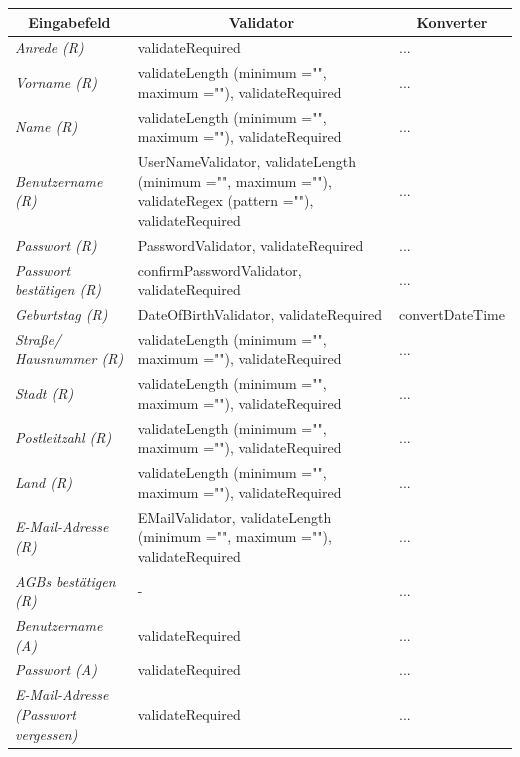 \begin{itemize}
\begin{itemize}
\begin{center}
\begin{longtable}{|p{3cm} |p{8cm} | p{5cm}|}
						\hline \multicolumn{1}{|c|}{\textbf{Eingabefeld}} & \multicolumn{1}{|c|}{\textbf{Validator}} & \multicolumn{1}{|c|}{\textbf{Konverter}} \\ \hline
						\endfirsthead
						\hline
						\endlastfoot
						\textit{Anrede (R)} & validateRequired & ...  \\ \hline
						\textit{Vorname (R)} & validateLength (minimum ="", maximum =""), validateRequired & ... \\ \hline
						\textit{Name (R)} & validateLength (minimum ="", maximum =""), validateRequired & ...  \\ \hline
						\textit{Benutzername (R)} & UserNameValidator, validateLength (minimum ="", maximum =""), validateRegex (pattern =""), validateRequired  & ... \\ \hline
						\textit{Passwort (R)} & PasswordValidator, validateRequired & ...  \\ \hline
						\textit{Passwort bestätigen (R)} & confirmPasswordValidator, validateRequired & ... \\ \hline
						\textit{Geburtstag (R)} & DateOfBirthValidator, validateRequired & convertDateTime  \\ \hline
						\textit{Straße/ Hausnummer (R)} & validateLength (minimum ="", maximum =""), validateRequired & ... \\ \hline
						\textit{Stadt (R)} & validateLength (minimum ="", maximum =""), validateRequired & ...  \\ \hline
						\textit{Postleitzahl (R)} & validateLength (minimum ="", maximum =""), validateRequired & ... \\ \hline
						\textit{Land (R)} & validateLength (minimum ="", maximum =""), validateRequired & ...  \\ \hline
						\textit{E-Mail-Adresse (R)} & EMailValidator, validateLength (minimum ="", maximum =""), validateRequired & ... \\ \hline
						\textit{AGBs bestätigen (R)} & - & ...  \\ \hline
						\textit{Benutzername (A)} & validateRequired & ...  \\ \hline
						\textit{Passwort (A)} & validateRequired & ...  \\ \hline
						\textit{E-Mail-Adresse (Passwort vergessen)} & validateRequired & ... \\ \hline
					\end{longtable}
				\end{center}
				

\end{itemize}
\end{itemize}

